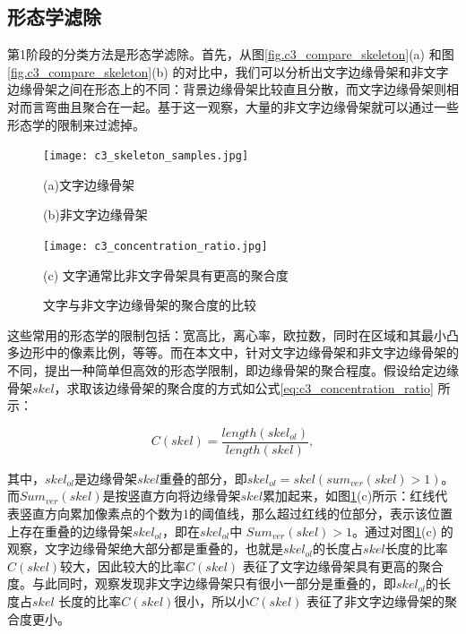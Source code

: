        \subsection{形态学滤除}

        第1阶段的分类方法是形态学滤除。首先，从图\ref{fig.c3_compare_skeleton}(a) 和图\ref{fig.c3_compare_skeleton}(b) 的对比中，我们可以分析出文字边缘骨架和非文字边缘骨架之间在形态上的不同：背景边缘骨架比较直且分散，而文字边缘骨架则相对而言弯曲且聚合在一起。基于这一观察，大量的非文字边缘骨架就可以通过一些形态学的限制来过滤掉。

        \begin{figure}[htbp]
        \centering
        \texttt{[image: c3\_skeleton\_samples.jpg]}
        \begin{minipage}[t]{0.48\linewidth}
        \centerline{\small (a)文字边缘骨架}
        \end{minipage}
        \begin{minipage}[t]{0.48\linewidth}
        \centerline{\small (b)非文字边缘骨架}
        \end{minipage}
        \texttt{[image: c3\_concentration\_ratio.jpg]}
        \centerline{\small (c) 文字通常比非文字骨架具有更高的聚合度}
        \caption{文字与非文字边缘骨架的聚合度的比较} \label{fig.c3_concentration_ratio}
        \end{figure}

        这些常用的形态学的限制包括：宽高比，离心率，欧拉数，同时在区域和其最小凸多边形中的像素比例，等等。而在本文中，针对文字边缘骨架和非文字边缘骨架的不同，提出一种简单但高效的形态学限制，即边缘骨架的聚合程度。假设给定边缘骨架$skel$，求取该边缘骨架的聚合度的方式如公式\ref{eq:c3_concentration_ratio} 所示：

        \begin{equation}
        C(skel)=\frac{length(skel_{ol})}{length(skel)},
        \label{eq:c3_concentration_ratio}
        \end{equation}

        其中，$skel_{ol}$是边缘骨架$skel$重叠的部分，即$skel_{ol}=skel(sum_{ver}(skel)>1)$。而$Sum_{ver}(skel)$是按竖直方向将边缘骨架$skel$累加起来，如图\ref{fig.c3_concentration_ratio}(c)所示：红线代表竖直方向累加像素点的个数为1的阈值线，那么超过红线的位部分，表示该位置上存在重叠的边缘骨架$skel_{ol}$，即在$skel_{ol}$中 $Sum_{ver}(skel)>1$。通过对图\ref{fig.c3_concentration_ratio}(c) 的观察，文字边缘骨架绝大部分都是重叠的，也就是$skel_{ol}$的长度占$skel$长度的比率$C(skel)$较大，因此较大的比率$C(skel)$ 表征了文字边缘骨架具有更高的聚合度。与此同时，观察发现非文字边缘骨架只有很小一部分是重叠的，即$skel_{ol}$的长度占$skel$ 长度的比率$C(skel)$很小，所以小$C(skel)$ 表征了非文字边缘骨架的聚合度更小。

